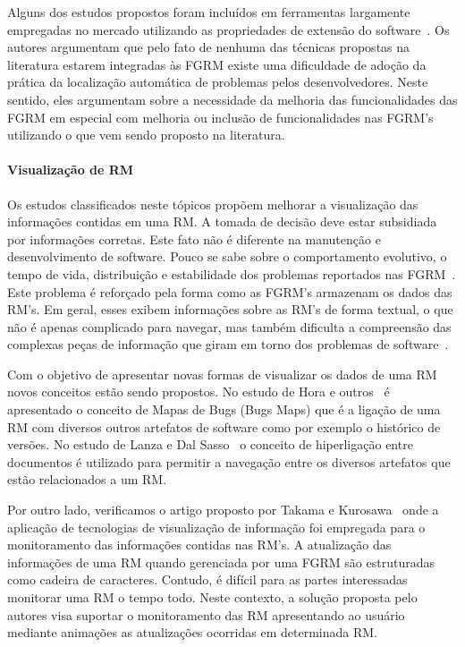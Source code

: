 Alguns dos estudos propostos foram incluídos em ferramentas largamente
empregadas no mercado utilizando as propriedades de extensão do
software~\cite{Thung:2014:BIT:2635868.2661678,corley2011recovering}. Os autores
argumentam que pelo fato de nenhuma das técnicas propostas na literatura estarem
integradas às FGRM existe uma dificuldade de adoção da prática da localização
automática de problemas pelos desenvolvedores. Neste sentido, eles argumentam
sobre a necessidade da melhoria das funcionalidades das FGRM em especial com
melhoria ou inclusão de funcionalidades nas FGRM's utilizando o que vem sendo
proposto na literatura.

\paragraph{Visualização de RM} Os estudos classificados neste tópicos propõem
melhorar a visualização das informações contidas em uma RM\@. A tomada de
decisão deve estar subsidiada por informações corretas. Este fato não é
diferente na manutenção e desenvolvimento de software. Pouco se sabe sobre o
comportamento evolutivo, o tempo de vida, distribuição e estabilidade dos
problemas reportados nas FGRM~\cite{hora2012bug}. Este problema é reforçado pela
forma como as FGRM's armazenam os dados das RM's. Em geral, esses exibem
informações sobre as RM's de forma textual, o que não é apenas complicado para
navegar, mas também dificulta a compreensão das complexas peças de informação
que giram em torno dos problemas de software~\cite{dal2014bug}.

Com o objetivo de apresentar novas formas de visualizar os dados de uma RM novos
conceitos estão sendo propostos. No estudo de Hora e outros~\cite{hora2012bug} é
apresentado o conceito de Mapas de Bugs (Bugs Maps) que é a ligação de uma RM
com diversos outros artefatos de software como por exemplo o histórico de
versões.  No estudo de Lanza e  Dal Sasso~\cite{dal2014bug} o conceito de
hiperligação entre documentos é utilizado para permitir a navegação entre os
diversos artefatos que estão relacionados a um RM\@.

Por outro lado, verificamos o artigo proposto por Takama e
Kurosawa~\cite{takama2013application} onde a aplicação de tecnologias de
visualização de informação foi empregada para o monitoramento das informações
contidas nas RM's. A atualização das informações de uma RM quando gerenciada por
uma FGRM são estruturadas como cadeira de caracteres. Contudo, é difícil para as
partes interessadas monitorar uma RM o tempo todo. Neste contexto, a solução
proposta pelo autores visa suportar o monitoramento das RM apresentando ao
usuário mediante animações as atualizações ocorridas em determinada RM\@.

